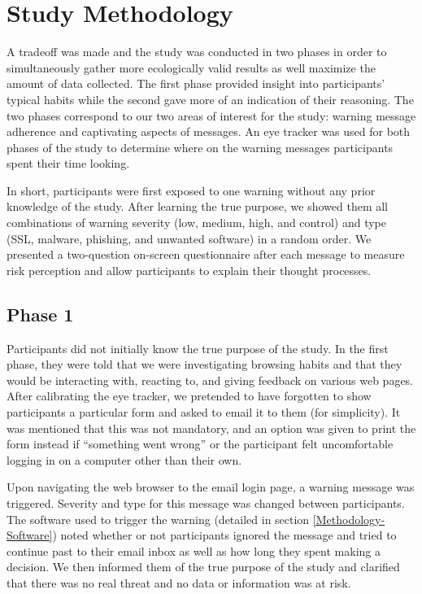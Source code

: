 \chapter{Study Methodology}
\label{Methodology}

A tradeoff was made and the study was conducted in two phases in order to simultaneously gather more ecologically valid results as well maximize the amount of data collected. The first phase provided insight into participants' typical habits while the second gave more of an indication of their reasoning. The two phases correspond to our two areas of interest for the study: warning message adherence and captivating aspects of messages. An eye tracker was used for both phases of the study to determine where on the warning messages participants spent their time looking.

In short, participants were first exposed to one warning without any prior knowledge of the study. After learning the true purpose, we showed them all combinations of warning severity (low, medium, high, and control) and type (SSL, malware, phishing, and unwanted software) in a random order. We presented a two-question on-screen questionnaire after each message to measure risk perception and allow participants to explain their thought processes.

\section{Phase 1}
Participants did not initially know the true purpose of the study. In the first phase, they were told that we were investigating browsing habits and that they would be interacting with, reacting to, and giving feedback on various web pages. After calibrating the eye tracker, we pretended to have forgotten to show participants a particular form and asked to email it to them (for simplicity). It was mentioned that this was not mandatory, and an option was given to print the form instead if ``something went wrong'' or the participant felt uncomfortable logging in on a computer other than their own.

Upon navigating the web browser to the email login page, a warning message was triggered. Severity and type for this message was changed between participants. The software used to trigger the warning (detailed in section \ref{Methodology-Software}) noted whether or not participants ignored the message and tried to continue past to their email inbox as well as how long they spent making a decision. We then informed them of the true purpose of the study and clarified that there was no real threat and no data or information was at risk.

